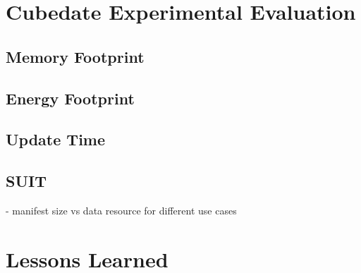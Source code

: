 \section{Cubedate Experimental Evaluation}
\label{sec:evaluation}

\subsection{Memory Footprint} 
\subsection{Energy Footprint} 
\subsection{Update Time}
\subsection{SUIT}
- manifest size vs data resource for different use cases

\section{Lessons Learned}
